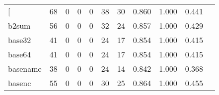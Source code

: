 \begin{longtable}{lp{1.20cm}p{1.20cm}p{1.20cm}p{1.20cm}p{1.20cm}p{1.20cm}p{1.20cm}p{1.20cm}p{1.20cm}p{1.20cm}}
\bottomrule
\endlastfoot
{[}         &                                    68 &                                                  0 &                                                  0 &                                                  0 &                                                 38 &                                                 30 &                                         0.860 &                                              1.000 &                                              0.441 \\
b2sum     &                                    56 &                                                  0 &                                                  0 &                                                  0 &                                                 32 &                                                 24 &                                         0.857 &                                              1.000 &                                              0.429 \\
base32    &                                    41 &                                                  0 &                                                  0 &                                                  0 &                                                 24 &                                                 17 &                                         0.854 &                                              1.000 &                                              0.415 \\
base64    &                                    41 &                                                  0 &                                                  0 &                                                  0 &                                                 24 &                                                 17 &                                         0.854 &                                              1.000 &                                              0.415 \\
basename  &                                    38 &                                                  0 &                                                  0 &                                                  0 &                                                 24 &                                                 14 &                                         0.842 &                                              1.000 &                                              0.368 \\
basenc    &                                    55 &                                                  0 &                                                  0 &                                                  0 &                                                 30 &                                                 25 &                                         0.864 &                                              1.000 &                                              0.455 \\

\end{longtable}
